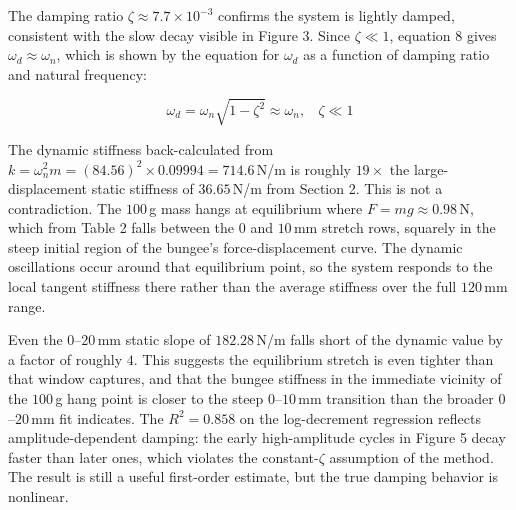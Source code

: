 \documentclass{article}
\begin{document}
The damping ratio $\zeta \approx 7.7 \times 10^{-3}$ confirms the system is lightly damped, consistent with the slow decay visible in Figure 3. Since $\zeta \ll 1$, equation 8 gives $\omega_d \approx \omega_n$, which is shown by the equation for $\omega_d$ as a function of damping ratio and natural frequency:

\begin{equation}
    \omega_d = \omega_n\sqrt{1-\zeta^2} \approx \omega_n,\:\:\:\:\zeta \ll 1
\end{equation}

\noindent The dynamic stiffness back-calculated from $k = \omega_n^2 m = (84.56)^2 \times 0.09994 = 714.6$\,N/m is roughly $19\times$ the large-displacement static stiffness of $36.65$\,N/m from Section 2. This is not a contradiction. The $100$\,g mass hangs at equilibrium where $F = mg \approx 0.98$\,N, which from Table 2 falls between the $0$ and $10$\,mm stretch rows, squarely in the steep initial region of the bungee's force-displacement curve. The dynamic oscillations occur around that equilibrium point, so the system responds to the local tangent stiffness there rather than the average stiffness over the full $120$\,mm range.

Even the $0$--$20$\,mm static slope of $182.28$\,N/m falls short of the dynamic value by a factor of roughly $4$. This suggests the equilibrium stretch is even tighter than that window captures, and that the bungee stiffness in the immediate vicinity of the $100$\,g hang point is closer to the steep $0$--$10$\,mm transition than the broader $0$--$20$\,mm fit indicates. The $R^2 = 0.858$ on the log-decrement regression reflects amplitude-dependent damping: the early high-amplitude cycles in Figure 5 decay faster than later ones, which violates the constant-$\zeta$ assumption of the method. The result is still a useful first-order estimate, but the true damping behavior is nonlinear.
\end{document}
